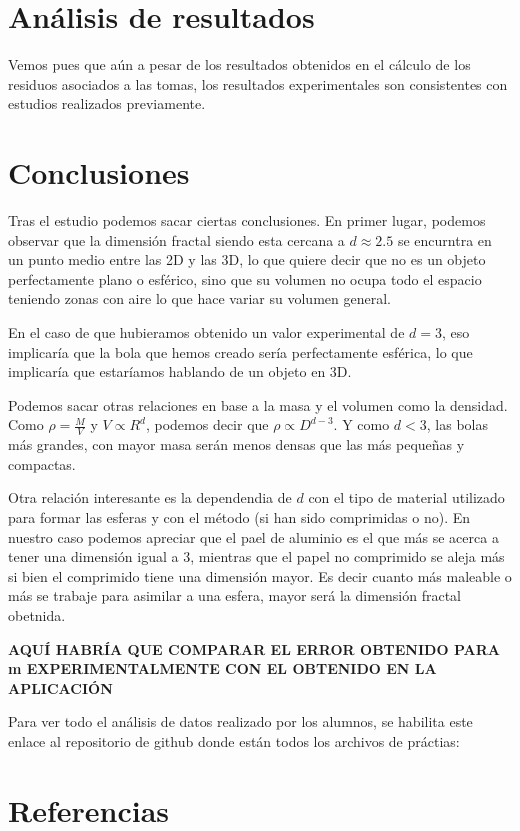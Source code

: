 \documentclass[11pt, a4paper, twocolumn]{article}
\begin{document}
\section{Análisis de resultados}


Vemos pues que aún a pesar de los resultados obtenidos en el cálculo de los residuos asociados a las tomas, los resultados
 experimentales son consistentes con estudios realizados previamente.  
\section{Conclusiones}

Tras el estudio podemos sacar ciertas conclusiones. En primer lugar, podemos observar que la dimensión fractal siendo esta cercana a $d\approx 2.5$
se encurntra en un punto medio entre las 2D y las 3D, lo que quiere decir que no es un objeto perfectamente plano o esférico, sino que su volumen no 
ocupa todo el espacio teniendo zonas con aire lo que hace variar su volumen general. 


En el caso de que hubieramos obtenido un valor experimental de $d = 3$, eso implicaría que la bola que hemos creado sería perfectamente esférica, 
lo que implicaría que estaríamos hablando de un objeto en 3D. 

\vspace{0.5cm}
Podemos sacar otras relaciones en base a la masa y el volumen como la densidad. Como $\rho = \frac{M}{V}$ y $V \propto R^d$, 
podemos decir que $\rho \propto D^{d-3}$. Y como $d < 3$, las bolas más grandes, con mayor masa serán menos densas que las más 
pequeñas y compactas. 

\vspace{0.5cm}

Otra relación interesante es la dependendia de $d$ con el tipo de material utilizado para formar las esferas y con el método (si han sido comprimidas o no). 
En nuestro caso podemos apreciar que el pael de aluminio es el que más se acerca a tener una dimensión igual a 3, mientras que el papel no comprimido se aleja más
si bien el comprimido tiene una dimensión mayor. Es decir cuanto más maleable o más se trabaje para asimilar a una esfera, mayor será la dimensión fractal obetnida.

\textbf{AQUÍ HABRÍA QUE COMPARAR EL ERROR OBTENIDO PARA m EXPERIMENTALMENTE CON EL OBTENIDO EN LA APLICACIÓN}

\vspace{1cm}
Para ver todo el análisis de datos realizado por los alumnos, se habilita este enlace al repositorio de github donde están todos los archivos de práctias: 


\section{Referencias}
\end{document}
